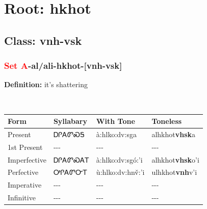 \needspace{4in}
\section*{Root: hkhot}
\nopagebreak
{}
\needspace{3in}
\subsection*{Class: vnh-vsk}
\nopagebreak
\needspace{2in}
\subsubsection*{\textcolor{Red}{Set A}{-}al/ali{-}\textbf{hkhot}{-}[vnh-vsk]}
\nopagebreak
\textbf{Definition: } it{\textquoteright}s shattering
\\[0.5em]
\begin{tabularx}{\textwidth}{l X X X}%
\toprule%
\textbf{Form}&\textbf{Syllabary}&\textbf{With Tone}&\textbf{Toneless}\\%
\midrule%
Present&ᎠᎵᎪᏛᏍᎦ&à:hlko:dv:sga&alhkhot\textbf{vhsk}a\\%
1st Present&{-}{-}{-}&{-}{-}{-}&{-}{-}{-}\\%
Imperfective&ᎠᎵᎪᏛᏍᎪᎢ&à:hlko:dv:sgó:’i&alhkhot\textbf{vhsk}o'i\\%
Perfective&ᎤᎵᎪᏛᏅᎢ&ù:hlko:dv:hnv̌:’i&ulhkhot\textbf{vnh}v'i\\%
Imperative&{-}{-}{-}&{-}{-}{-}&{-}{-}{-}\\%
Infinitive&{-}{-}{-}&{-}{-}{-}&{-}{-}{-}\\%
\bottomrule%
\end{tabularx}
\\[1em]